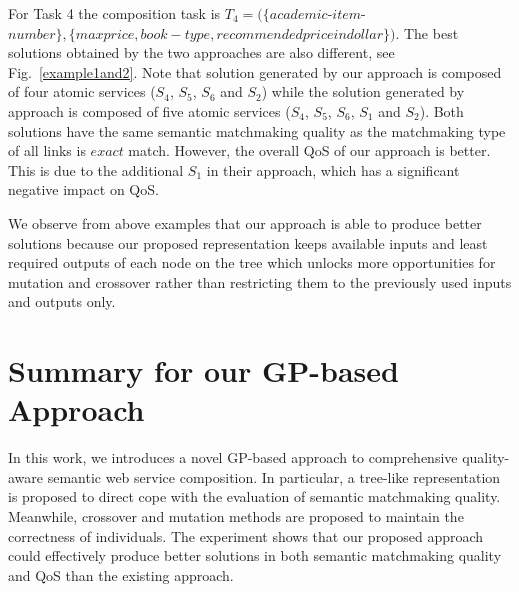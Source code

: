 For Task 4 the composition task is $T_4=(\{academic$-$item$-$number\},\{ maxprice, book-type,recommendedpriceindollar\})$. The best solutions obtained by the two approaches are also different, see Fig.~\ref{example1and2}. Note that solution generated by our approach is composed of four atomic services ($S_4$, $S_5$, $S_6$ and $S_2$) while the solution generated by approach \cite{ma2015hybrid} is composed of  five atomic services ($S_4$, $S_5$, $S_6$, $S_1$ and $S_2$). Both solutions have the same semantic matchmaking quality as the matchmaking type of all links is $exact$ match. However, the overall QoS of our approach is better. This is due to the additional $S_1$ in their approach, which has a significant negative impact on QoS.

We observe from above examples that our approach is able to produce better solutions because our proposed representation keeps available inputs and least required outputs of each node on the tree which unlocks more opportunities for 
mutation and crossover rather than restricting them to the previously used inputs and outputs only.



\section{Summary for our GP-based Approach}\label{summary2}

In this work, we introduces a novel GP-based approach to comprehensive quality-aware semantic web service composition. In particular, a tree-like representation is proposed to direct cope with the evaluation of semantic matchmaking quality. Meanwhile, crossover and mutation methods are proposed to maintain the correctness of individuals. The experiment  shows that our proposed approach could effectively produce better solutions in both semantic matchmaking quality and QoS than the existing approach.

